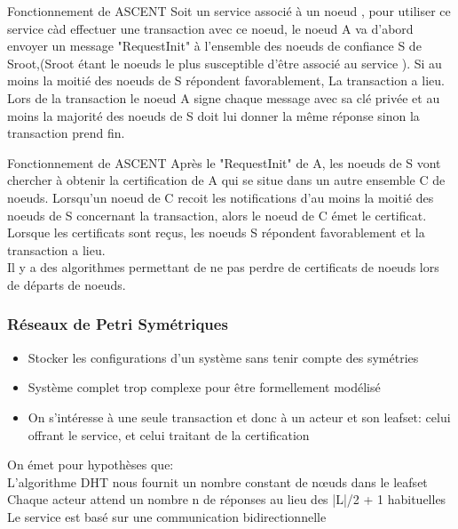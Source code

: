 \documentclass[french]{beamer}
\begin{document}
\begin{frame}{Fonctionnement de ASCENT}
Soit un service associé à un noeud , pour utiliser ce service càd effectuer une transaction avec ce noeud, le noeud A va d'abord envoyer un message  "RequestInit" à l'ensemble des noeuds de confiance S de Sroot,(Sroot étant le noeuds le plus susceptible d'être associé au service ). Si au moins la moitié des noeuds de S répondent favorablement, La transaction a lieu.\\
Lors de la transaction le noeud A signe chaque message avec sa clé privée et au moins la majorité des noeuds de S doit lui donner la même réponse sinon la transaction prend fin.
\end{frame}
\begin{frame}{Fonctionnement de ASCENT}
Après le "RequestInit" de A, les noeuds de S vont chercher à obtenir la  certification de A qui se situe dans un autre ensemble C de noeuds. Lorsqu'un noeud de C recoit les notifications d'au moins la moitié des noeuds de S concernant la transaction, alors le noeud de C émet le certificat. Lorsque les certificats sont reçus, les noeuds S répondent favorablement et la transaction a lieu.\\
Il y a des algorithmes permettant de ne pas perdre de certificats de noeuds lors de départs de noeuds.
\end{frame}
\begin{frame}
  \frametitle{Réseaux de Petri Symétriques}
  
  \begin{itemize}
      \item Stocker les configurations d’un système sans tenir compte des symétries\\
      \item Système complet trop complexe pour être formellement modélisé
      \item On s'intéresse à une seule transaction et donc à un acteur et son leafset: celui offrant le service, et celui traitant de la certification
    \end{itemize}
On émet pour hypothèses que:\\ 
L’algorithme DHT nous fournit un nombre constant de nœuds dans le leafset\\
Chaque acteur attend un nombre n de réponses au lieu des |L|/2 + 1 habituelles\\
Le service est basé sur une communication bidirectionnelle\\
\end{frame}
\end{document}
